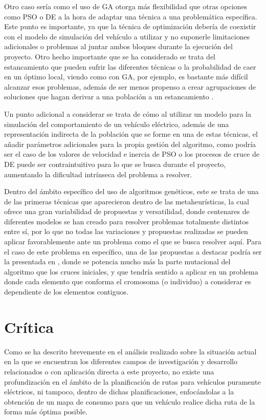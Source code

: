 \documentclass[11pt,spanish,listoffigures,listoftables]{tfgetsinf}
\begin{document}
Otro caso sería como el uso de GA otorga más flexibilidad que otras opciones como PSO o DE a la hora de adaptar una técnica a una problemática específica. Este punto es importante, ya que la técnica de optimización debería de coexistir con el modelo de simulación del vehículo a utilizar y no suponerle limitaciones adicionales o problemas al juntar ambos bloques durante la ejecución del proyecto. Otro hecho importante que se ha considerado se trata del estancamiento que pueden sufrir las diferentes técnicas o la probabilidad de caer en un óptimo local, viendo como con GA, por ejemplo, es bastante más difícil alcanzar esos problemas, además de ser menos propenso a crear agrupaciones de soluciones que hagan derivar a una población a un estancamiento \cite{GANDOMI20131}.

Un punto adicional a considerar se trata de cómo al utilizar un modelo para la simulación del comportamiento de un vehículo eléctrico, además de una representación indirecta de la población que se forme en una de estas técnicas, el añadir parámetros adicionales para la propia gestión del algoritmo, como podría ser el caso de los valores de velocidad e inercia de PSO o los procesos de cruce de DE puede ser contraintuitivo para lo que se busca durante el proyecto, aumentando la dificultad intrínseca del problema a resolver.

Dentro del ámbito específico del uso de algoritmos genéticos, este se trata de una de las primeras técnicas que aparecieron dentro de las metaheurísticas, la cual ofrece una gran variabilidad de propuestas y versatilidad, donde centenares de diferentes modelos se han creado para resolver problemas totalmente distintos entre sí, por lo que no todas las variaciones y propuestas realizadas se pueden aplicar favorablemente ante un problema como el que se busca resolver aquí. Para el caso de este problema en específico, una de las propuestas a destacar podría ser la presentada en \cite{DEFALCO2002285}, donde se potencia mucho más la parte mutacional del algoritmo que los cruces iniciales, y que tendría sentido a aplicar en un problema donde cada elemento que conforma el cromosoma (o individuo) a considerar es dependiente de los elementos contiguos.

\section{Crítica}
Como se ha descrito brevemente en el análisis realizado sobre la situación actual en la que se encuentran los diferentes campos de investigación y desarrollo relacionados o con aplicación directa a este proyecto, no existe una profundización en el ámbito de la planificación de rutas para vehículos puramente eléctricos, ni tampoco, dentro de dichas planificaciones, enfocándolas a la obtención de un mapa de consumo para que un vehículo realice dicha ruta de la forma más óptima posible.
\end{document}

